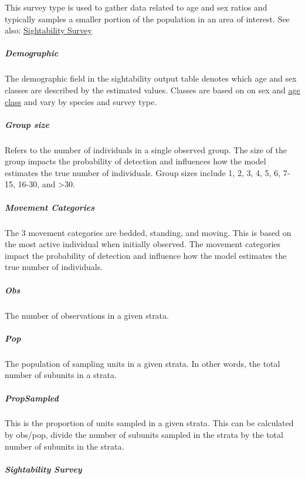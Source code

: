 \documentclass[
]{book}
\begin{document}
This survey type is used to gather data related to age and sex ratios and typically samples a smaller portion of the population in an area of interest. See also: \protect\hyperlink{gl-sight-survey}{Sightability Survey}

\hypertarget{gl-demographic}{%
\subparagraph*{Demographic}\label{gl-demographic}}

The demographic field in the sightability output table denotes which age and sex classes are described by the estimated values. Classes are based on on sex and \protect\hyperlink{gl-age-classes}{age class} and vary by species and survey type.

\hypertarget{gl-group-size}{%
\subparagraph*{Group size}\label{gl-group-size}}

Refers to the number of individuals in a single observed group. The size of the group impacts the probability of detection and influences how the model estimates the true number of individuals. Group sizes include 1, 2, 3, 4, 5, 6, 7-15, 16-30, and \textgreater30.

\hypertarget{gl-movement}{%
\subparagraph*{Movement Categories}\label{gl-movement}}

The 3 movement categories are bedded, standing, and moving. This is based on the most active individual when initially observed. The movement categories impact the probability of detection and influence how the model estimates the true number of individuals.

\hypertarget{gl-obs}{%
\subparagraph*{Obs}\label{gl-obs}}

The number of observations in a given strata.

\hypertarget{gl-pop}{%
\subparagraph*{Pop}\label{gl-pop}}

The population of sampling units in a given strata. In other words, the total number of subunits in a strata.

\hypertarget{gl-prop-sampled}{%
\subparagraph*{PropSampled}\label{gl-prop-sampled}}

This is the proportion of units sampled in a given strata. This can be calculated by obs/pop, divide the number of subunits sampled in the strata by the total number of subunits in the strata.

\hypertarget{gl-sight-survey}{%
\subparagraph*{Sightability Survey}\label{gl-sight-survey}}
\end{document}
